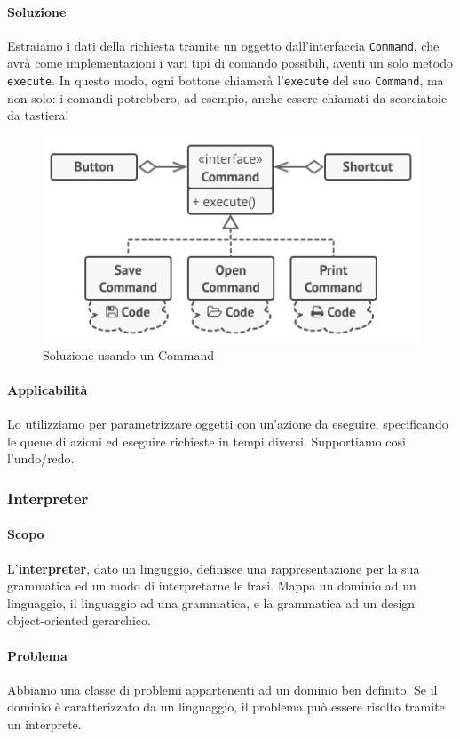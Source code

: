 \documentclass[11pt]{article}
\newcommand{\code}[1]{\texttt{#1}}
\begin{document}
\paragraph{Soluzione}
Estraiamo i dati della richiesta tramite un oggetto dall'interfaccia \code{Command}, che avrà come implementazioni i vari tipi di comando possibili, aventi un solo metodo \code{execute}. In questo modo, ogni bottone chiamerà l'\code{execute} del suo \code{Command}, ma non solo: i comandi potrebbero, ad esempio, anche essere chiamati da scorciatoie da tastiera!
\begin{figure}[H]
    \centering
    \includegraphics[width=0.6\linewidth]{res/teoria/Command.png}
    \caption{Soluzione usando un Command}
\end{figure}
\paragraph{Applicabilità}
Lo utilizziamo per parametrizzare oggetti con un'azione da eseguire, specificando le queue di azioni ed eseguire richieste in tempi diversi. Supportiamo così l'undo/redo.
\subsubsection{Interpreter}
\paragraph{Scopo}
L'\textbf{interpreter}, dato un linguggio, definisce una rappresentazione per la sua grammatica ed un modo di interpretarne le frasi. Mappa un dominio ad un linguaggio, il linguaggio ad una grammatica, e la grammatica ad un design object-oriented gerarchico.
\paragraph{Problema}
Abbiamo una classe di problemi appartenenti ad un dominio ben definito. Se il dominio è caratterizzato da un linguaggio, il problema può essere risolto tramite un interprete. 
\end{document}
